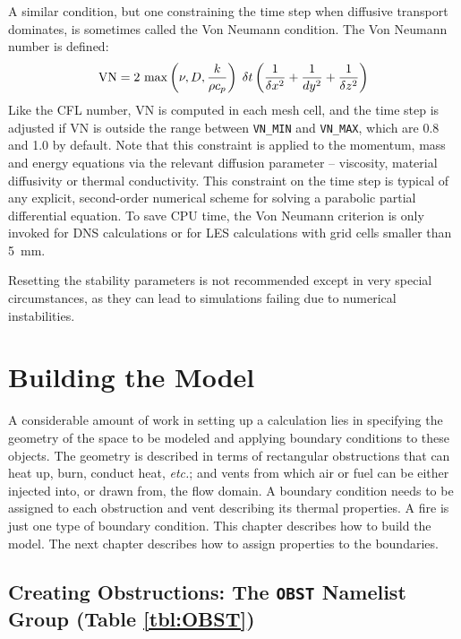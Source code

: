 \documentclass[11pt]{book}
\newcommand{\ct}{\tt\small}
\newcommand{\dx}{\delta x}
\newcommand{\dz}{\delta z}
\newcommand{\dt}{\delta t}
\newcommand{\be}{\begin{equation}}
\newcommand{\ee}{\end{equation}}
\begin{document}
A similar condition, but one constraining the time step when diffusive transport dominates, is sometimes called
the Von Neumann condition. The Von Neumann number is defined:
\be
\hbox{VN} = 2 \, \max \left( \nu , D , \frac{k}{\rho c_p} \right)  \; \dt  \left(\frac{1}{\dx^2}+\frac{1}{dy^2}+\frac{1}{\dz^2} \right)
\ee
Like the CFL number, VN is computed in each mesh cell, and the time step is adjusted if VN is outside the
range between {\ct VN\_MIN} and {\ct VN\_MAX}, which are 0.8 and 1.0 by default.
Note that this constraint is applied to the momentum, mass and energy equations via the
relevant diffusion parameter -- viscosity, material diffusivity or thermal conductivity.
This constraint on the time step is typical
of any explicit, second-order numerical scheme for solving a parabolic partial differential
equation. To save CPU time, the Von Neumann criterion is only invoked for DNS calculations or for LES
calculations with grid cells smaller than 5~mm.

\begin{warning}
Resetting the stability parameters is not recommended except in very special circumstances, as they can lead to
simulations failing due to numerical instabilities.
\end{warning}








\chapter{Building the Model}

A considerable amount of work in setting up a calculation lies in specifying the
geometry of the space to be modeled and applying boundary conditions
to these objects. The geometry is described in terms
of rectangular obstructions that can heat up, burn, conduct heat, {\em etc.};
and vents from which air or fuel can be
either injected into, or drawn from, the flow domain.
A boundary condition needs to be assigned to each obstruction
and vent describing its thermal properties. A fire is just one type of
boundary condition. This chapter describes how to build the model. The next
chapter describes how to assign properties to the boundaries.



\section{Creating Obstructions: The \texorpdfstring{{\tt OBST}}{OBST} Namelist Group (Table \ref{tbl:OBST})}
\label{info:OBST}
\end{document}
